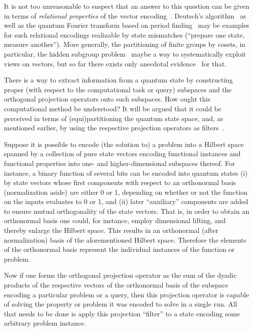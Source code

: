 \documentclass{ws-procs9x6}
\begin{document}
It is not too unreasonable to suspect that an answer to this question can be given in terms
of \emph{relational properties} of the vector encoding~\cite{2007-tkadlec-svozil-springer,svozil-2019-s}.
Deutsch's algorithm~\cite[Section~1.4.3]{nielsen-book10} as well as the quantum Fourier transform
based on period finding~\cite[Section~5.4.1]{nielsen-book10} may be examples for such relational encodings
realizable by state mismatches (``prepare one state, measure another'').
More generally, the partitioning of finite groups by cosets, in particular, the hidden subgroup problem~\cite[Section~5.4.3]{nielsen-book10}
maybe a way to systematically exploit views on vectors,
but so far there exists only anecdotal evidence~\cite[Figure 5.5., p.~241]{nielsen-book10} for that.


There is a way to extract information from a quantum state by constructing proper (with respect to the computational task or query) subspaces
and the orthogonal projection operators onto such subspaces.
How ought this computational method be understood?
It will be argued that it could be perceived in terms of (equi)partitioning the quantum state space,
and, as mentioned earlier,
by using the respective projection operators as filters~\cite{DonSvo01,svozil-2002-statepart-prl,svozil-2003-garda}.

Suppose it is possible to encode (the solution to) a problem into a Hilbert space spanned by a
collection of pure state vectors encoding functional instances and functional properties into one- and higher-dimensional subspaces thereof.
For instance, a binary function of several bits can be encoded into quantum states
(i) by state vectors whose first components with respect to an orthonormal basis (normalization aside) are either 0 or 1,
depending on whether or not the function on the inputs evaluates to 0 or 1, and
(ii)
later ``auxiliary'' components are added to ensure mutual orthogonality of the state vectors.
That is, in order to obtain an orthonormal basis one could, for instance, employ dimensional lifting, and thereby enlarge the Hilbert space.
This results in an orthonormal (after normalization) basis of the aforementioned Hilbert space.
Therefore the elements of the orthonormal basis represent the individual instances of the function or problem.

Now if one forms the orthogonal projection operator
as the sum of the dyadic products of the respective vectors of the orthonormal basis of the subspace encoding a particular problem or a query,
then this projection operator is capable of solving the property or problem it was encoded to solve in a single run.
All that needs to be done is apply this projection ``filter'' to a state encoding some arbitrary problem instance.
\end{document}
